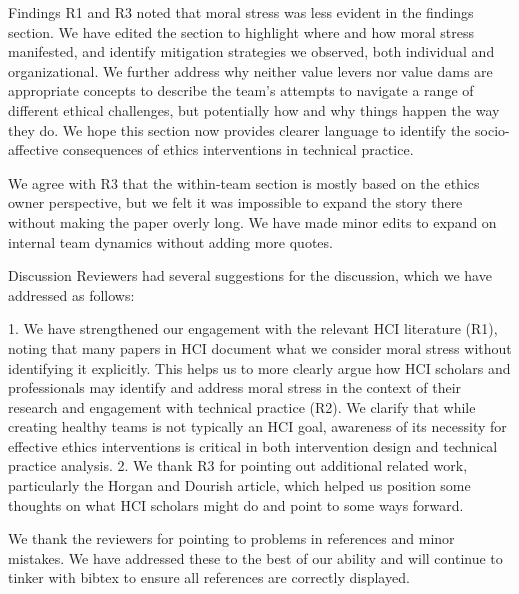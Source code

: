 Findings
R1 and R3 noted that moral stress was less evident in the findings section. We have edited the section to highlight where and how moral stress manifested, and identify mitigation strategies we observed, both individual and organizational. We further address why neither value levers nor value dams are appropriate concepts to describe the team’s attempts to navigate a range of different ethical challenges, but potentially how and why things happen the way they do. We hope this section now provides clearer language to identify the socio-affective consequences of ethics interventions in technical practice. 

We agree with R3 that the within-team section is mostly based on the ethics owner perspective, but we felt it was impossible to expand the story there without making the paper overly long. We have made minor edits to expand on internal team dynamics without adding more quotes.

Discussion
Reviewers had several suggestions for the discussion, which we have addressed as follows:

1.	We have strengthened our engagement with the relevant HCI literature (R1), noting that many papers in HCI document what we consider moral stress without identifying it explicitly. This helps us to more clearly argue how HCI scholars and professionals may identify and address moral stress in the context of their research and engagement with technical practice (R2). We clarify that while creating healthy teams is not typically an HCI goal, awareness of its necessity for effective ethics interventions is critical in both intervention design and technical practice analysis.  
2.	We thank R3 for pointing out additional related work, particularly the Horgan and Dourish article, which helped us position some thoughts on what HCI scholars might do and point to some ways forward. 

We thank the reviewers for pointing to problems in references and minor mistakes. We have addressed these to the best of our ability and will continue to tinker with bibtex to ensure all references are correctly displayed.





